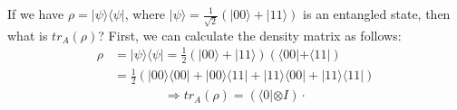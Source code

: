 \documentclass[UTF8,12pt]{article} %
\begin{document}
If we have $\rho = |\psi\rangle\langle\psi|$, where $|\psi\rangle = \frac{1}{\sqrt{2}}(|00\rangle + |11\rangle)$ is an entangled state, then what is $tr_{A}(\rho)$? First, we can calculate the density matrix as follows:
\begin{align}
\rho &= |\psi\rangle\langle\psi| = \frac{1}{2}(|00\rangle + |11\rangle)(\langle 00| + \langle 11|) \\
&= \frac{1}{2}(|00\rangle\langle00| + |00\rangle\langle11| + |11\rangle\langle00| + |11\rangle\langle11|)
\end{align}
\begin{align}
\Rightarrow tr_{A}(\rho) = (\langle0|\otimes I) \cdot 
\end{align}
\end{document}
